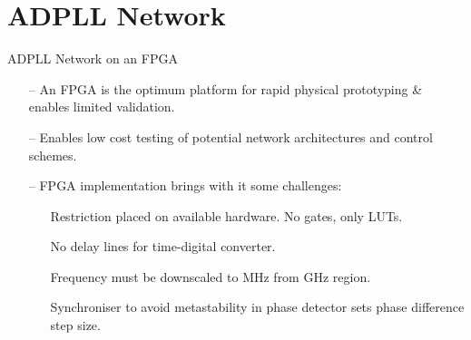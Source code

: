 \documentclass{beamer}
\begin{document}
\section*{ADPLL Network}
\begin{frame}{ADPLL Network on an FPGA}

    \begin{itemize}
        \item[--]
            An FPGA is the optimum platform for rapid physical prototyping \& enables limited validation.
        \item[--]
        	Enables low cost testing of potential network architectures and control schemes.
        \item[--]
        	FPGA implementation brings with it some challenges:
        	\begin{itemize}
        		\item[]
        			Restriction placed on available hardware. No gates, only LUTs.
        		\item[]
        			No delay lines for time-digital converter.
        		\item[]
        			Frequency must be downscaled to MHz from GHz region.
        		\item[] 
        			Synchroniser to avoid metastability in phase detector sets phase difference step size.
        		
        	\end{itemize}
    \end{itemize}
\end{frame}
\end{document}

